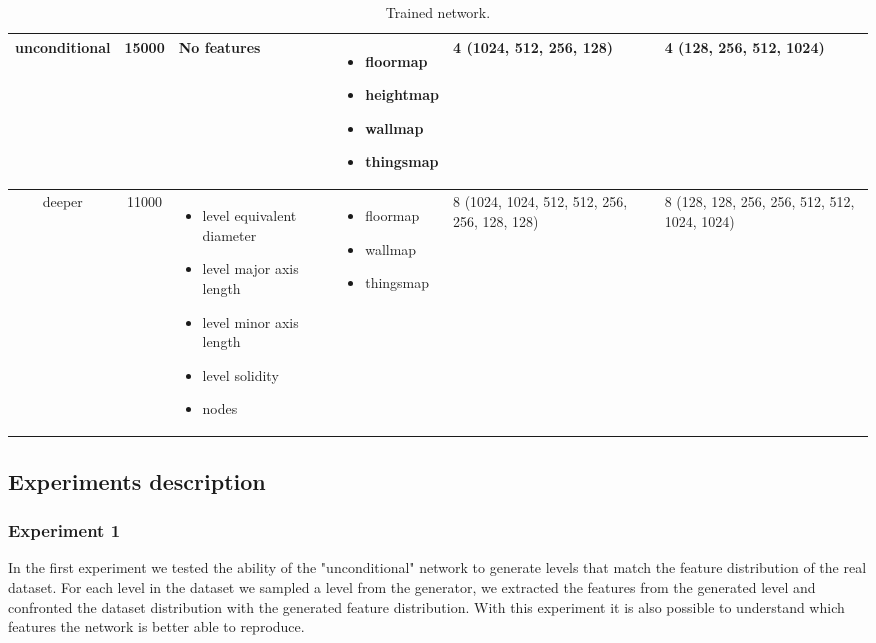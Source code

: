 \begin{table}[h!]
\begin{tabularx}{\textwidth}{| c | c | X | X | X | X |}
		\hline
		
		unconditional & 15000 & 
		No features
		& 
		\begin{itemize}
			\raggedright
			\small
			\item[] floormap
			\item[] heightmap
			\item[] wallmap
			\item[] thingsmap
		\end{itemize}
		& 4 (1024, 512, 256, 128) & 4 (128, 256, 512, 1024)\\
		
		\hline
		
		deeper & 11000 & 
		\begin{itemize}
			\raggedright
			\small
			\item[] level equivalent diameter
			\item[] level major axis length
			\item[] level minor axis length
			\item[] level solidity
			\item[] nodes
		\end{itemize}
		& 
		\begin{itemize}
			\raggedright
			\small
			\item[] floormap
			\item[] wallmap
			\item[] thingsmap
		\end{itemize}
		& 8 (1024, 1024, 512, 512, 256,  256, 128, 128) & 8 (128, 128, 256, 256, 512, 512, 1024, 1024)\\
		\hline
		
	\end{tabularx}
	\caption[ Trained Models ]{ Trained network. }
	\label{tab:trained_models}
\end{table}	

\subsection{Experiments description}
\subsubsection{Experiment 1}
In the first experiment we tested the ability of the "unconditional" network to generate levels that match the feature distribution of the real dataset. For each level in the dataset we sampled a level from the generator, we extracted the features from the generated level and confronted the dataset distribution with the generated feature distribution. With this experiment it is also possible to understand which features the network is better able to reproduce.

